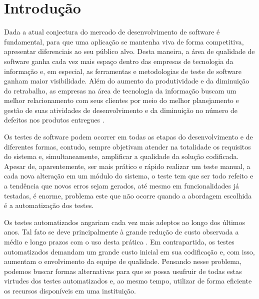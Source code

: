 \documentclass[tg]{mdtufsm}
\begin{document}
\tableofcontents
\listoffigures
\listoftables

\setlength{\baselineskip}{1.5\baselineskip}


\chapter{Introdução}

Dada a atual conjectura do mercado de desenvolvimento de software é fundamental, para
que uma aplicação se mantenha viva de forma competitiva, apresentar diferenciais ao seu público alvo. Desta maneira, a área de qualidade de software ganha cada vez mais espaço dentro das empresas de tecnologia da informação e, em especial, as ferramentas e
metodologias de teste de software ganham maior visibilidade. Além do aumento da produtividade e da diminuição do retrabalho, as empresas na área de tecnologia da informação buscam um melhor relacionamento com seus clientes por meio do melhor planejamento e gestão de suas atividades de desenvolvimento e da diminuição no número de defeitos nos produtos entregues \cite{jomori2004qualidade}.

Os testes de software podem ocorrer em todas as etapas do desenvolvimento e de diferentes formas, contudo,
sempre objetivam atender na totalidade os requisitos do sistema e, simultaneamente, amplificar a qualidade da solução
codificada. Apesar de, aparentemente, ser mais prático e rápido realizar um teste manual, a cada nova alteração em um módulo do sistema,
o teste tem que ser todo refeito e a tendência que novos erros sejam gerados, até mesmo em funcionalidades já testadas, é enorme,
problema este que não ocorre quando a abordagem escolhida é a automatização dos testes. 

Os testes automatizados angariam cada vez mais adeptos ao longo dos últimos anos. Tal fato se deve principalmente à grande redução de custo observada a médio e longo prazos com o uso desta prática \cite{de2007utilizaccao}. Em contrapartida, os testes automatizados demandam um grande custo inicial em sua codificação e, com isso, aumentam o
envolvimento da equipe de qualidade. Pensando nesse problema, podemos buscar formas alternativas para que se possa usufruir de todas estas virtudes dos testes automatizados e, ao mesmo tempo, utilizar de forma eficiente os recursos disponíveis em uma instituição.
\end{document}
